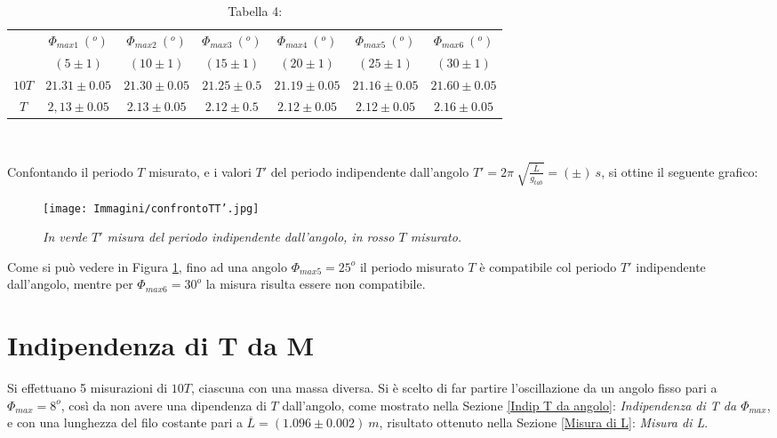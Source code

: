 \documentclass[12pt, a4paper]{article}
\begin{document}
\begin{table}[ht] 
\centering
\begin{tabular}{|c|c|c|c|c|c|c|} 

 \hline
  &$\Phi_{max1}\ (^o)$ & $\Phi_{max2}\ (^o)$ & $\Phi_{max3}\ (^o)$ & $\Phi_{max4}\ (^o)$ & $\Phi_{max5}\ (^o)$ & $\Phi_{max6}\ (^o)$  \\
    &$(5\pm1)$ & $(10\pm1)$ & $(15\pm1)$ & $(20\pm1)$ & $(25\pm1)$ & $(30\pm1)$  \\
\hline

  $10T$& $21.31\pm 0.05 $&$21.30\pm0.05$&$21.25\pm0.5$&$21.19\pm0.05$ &$21.16\pm0.05$&$21.60\pm 0.05$\\
\hline
 $T$& $2,13\pm 0.05 $&$2.13\pm0.05$&$2.12\pm0.5$&$2.12\pm0.05$ &$2.12\pm0.05$&$2.16\pm 0.05$\\
\hline

\end{tabular}\\
\caption*{\centering Tabella 4:\small{\textit{ } }}
    \label{tab T indip Angolo}
\end{table}


\newpage

Confontando il periodo $T$ misurato, e i valori $T'$ del periodo indipendente dall'angolo $\displaystyle T'=2\pi\ \sqrt{\frac{\overline{L}}{g_{tab}}}=(\pm)\ s$, si ottine il seguente grafico:



    \begin{figure}[h!]
\centering
\texttt{[image: Immagini/confrontoTT'.jpg]}
\caption{\textit{{\footnotesize{In verde $T'$ misura del periodo indipendente dall'angolo, in rosso $T$ misurato.  }}}}
\label{confrontoTT'}
\end{figure}

Come si può vedere in Figura \ref{confrontoTT'}, fino ad una angolo $\Phi_{max5}=25^o$ il periodo misurato $T$ è compatibile col periodo $T'$ indipendente dall'angolo, mentre per $\Phi_{max6}=30^o$ la misura risulta essere non compatibile. 



\section{Indipendenza di T da M}
\label{Indip T da M}
Si effettuano 5 misurazioni di $10T$, ciascuna con una massa diversa. Si è scelto di far partire l'oscillazione da un angolo fisso pari a $\Phi_{max}=8^o$, così da non avere una dipendenza di $T$ dall'angolo, come mostrato nella Sezione \ref{Indip T da angolo}: \textit{Indipendenza di T da $\Phi_{max}$}, e con una lunghezza del filo costante pari a $\overline{L}=(1.096\pm0.002)\ m$, risultato ottenuto nella Sezione \ref{Misura di L}: \textit{Misura di L}.
\end{document}
